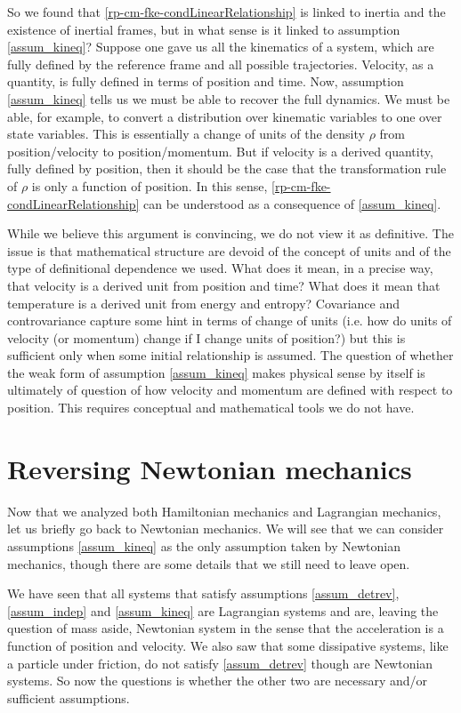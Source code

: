 So we found that \ref{rp-cm-fke-condLinearRelationship} is linked to inertia and the existence of inertial frames, but in what sense is it linked to assumption \ref{assum_kineq}? Suppose one gave us all the kinematics of a system, which are fully defined by the reference frame and all possible trajectories. Velocity, as a quantity, is fully defined in terms of position and time. Now, assumption \ref{assum_kineq} tells us we must be able to recover the full dynamics. We must be able, for example, to convert a distribution over kinematic variables to one over state variables. This is essentially a change of units of the density $\rho$ from position/velocity to position/momentum. But if velocity is a derived quantity, fully defined by position, then it should be the case that the transformation rule of $\rho$ is only a function of position. In this sense, \ref{rp-cm-fke-condLinearRelationship} can be understood as a consequence of \ref{assum_kineq}.

While we believe this argument is convincing, we do not view it as definitive. The issue is that mathematical structure are devoid of the concept of units and of the type of definitional dependence we used. What does it mean, in a precise way, that velocity is a derived unit from position and time? What does it mean that temperature is a derived unit from energy and entropy? Covariance and controvariance capture some hint in terms of change of units (i.e. how do units of velocity (or momentum) change if I change units of position?) but this is sufficient only when some initial relationship is assumed. The question of whether the weak form of assumption \ref{assum_kineq} makes physical sense by itself is ultimately of question of how velocity and momentum are defined with respect to position. This requires conceptual and mathematical tools we do not have.

\section{Reversing Newtonian mechanics}

Now that we analyzed both Hamiltonian mechanics and Lagrangian mechanics, let us briefly go back to Newtonian mechanics. We will see that we can consider assumptions \ref{assum_kineq} as the only assumption taken by Newtonian mechanics, though there are some details that we still need to leave open.

We have seen that all systems that satisfy assumptions \ref{assum_detrev}, \ref{assum_indep} and \ref{assum_kineq} are Lagrangian systems and are, leaving the question of mass aside, Newtonian system in the sense that the acceleration is a function of position and velocity. We also saw that some dissipative systems, like a particle under friction, do not satisfy \ref{assum_detrev} though are Newtonian systems. So now the questions is whether the other two are necessary and/or sufficient assumptions.

